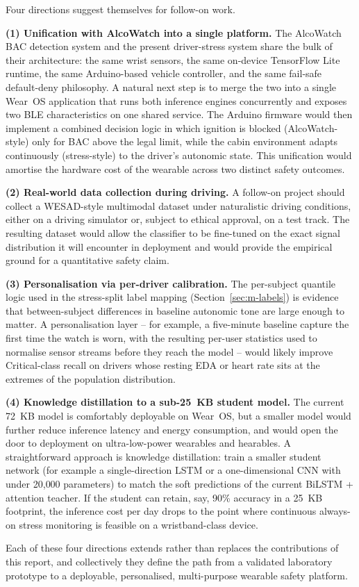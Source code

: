 Four directions suggest themselves for follow-on work.

\textbf{(1) Unification with AlcoWatch into a single platform.} The
AlcoWatch BAC detection system \citep{acn1408} and the present
driver-stress system share the bulk of their architecture: the same
wrist sensors, the same on-device TensorFlow Lite runtime, the same
Arduino-based vehicle controller, and the same fail-safe default-deny
philosophy. A natural next step is to merge the two into a single
Wear~OS application that runs both inference engines concurrently
and exposes two BLE characteristics on one shared service. The
Arduino firmware would then implement a combined decision logic in
which ignition is blocked (AlcoWatch-style) only for BAC above the
legal limit, while the cabin environment adapts continuously
(stress-style) to the driver's autonomic state. This unification
would amortise the hardware cost of the wearable across two distinct
safety outcomes.

\textbf{(2) Real-world data collection during driving.} A follow-on
project should collect a WESAD-style multimodal dataset under
naturalistic driving conditions, either on a driving simulator or,
subject to ethical approval, on a test track. The resulting dataset
would allow the classifier to be fine-tuned on the exact signal
distribution it will encounter in deployment and would provide the
empirical ground for a quantitative safety claim.

\textbf{(3) Personalisation via per-driver calibration.} The
per-subject quantile logic used in the stress-split label mapping
(Section~\ref{sec:m-labels}) is evidence that between-subject
differences in baseline autonomic tone are large enough to matter.
A personalisation layer -- for example, a five-minute baseline
capture the first time the watch is worn, with the resulting per-user
statistics used to normalise sensor streams before they reach the
model -- would likely improve Critical-class recall on drivers whose
resting EDA or heart rate sits at the extremes of the population
distribution.

\textbf{(4) Knowledge distillation to a sub-25~KB student model.}
The current 72~KB model is comfortably deployable on Wear~OS, but
a smaller model would further reduce inference latency and energy
consumption, and would open the door to deployment on ultra-low-power
wearables and hearables. A straightforward approach is knowledge
distillation: train a smaller student network (for example a
single-direction LSTM or a one-dimensional CNN with under 20{,}000
parameters) to match the soft predictions of the current BiLSTM +
attention teacher. If the student can retain, say, 90\% accuracy
in a 25~KB footprint, the inference cost per day drops to the point
where continuous always-on stress monitoring is feasible on a
wristband-class device.

Each of these four directions extends rather than replaces the
contributions of this report, and collectively they define the path
from a validated laboratory prototype to a deployable, personalised,
multi-purpose wearable safety platform.
